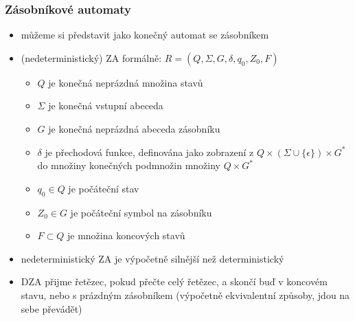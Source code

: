 \subsubsection*{Zásobníkové automaty}
\begin{itemize}
	\item můžeme si představit jako konečný automat se zásobníkem
	\item (nedeterministický) ZA formálně: $R = (Q, \Sigma, G, \delta, q_0, Z_0, F)$
	\begin{itemize}
		\item $Q$ je konečná neprázdná množina stavů
		\item $\Sigma$ je konečná vstupní abeceda
		\item $G$ je konečná neprázdná abeceda zásobníku
		\item $\delta$ je přechodová funkce, definována jako zobrazení z $Q \times (\Sigma \cup \{\epsilon\}) \times G^*$ do množiny konečných podmnožin množiny $Q \times G^*$
		\item $q_0 \in Q$ je počáteční stav
		\item $Z_0 \in G$ je počáteční symbol na zásobníku
		\item $F \subset Q$ je množina koncových stavů
	\end{itemize}
	\item nedeterministický ZA je výpočetně silnější než deterministický
	\item DZA přijme řetězec, pokud přečte celý řetězec, a skončí buď v koncovém stavu, nebo s prázdným zásobníkem (výpočetně ekvivalentní způsoby, jdou na sebe převádět)
\end{itemize}

